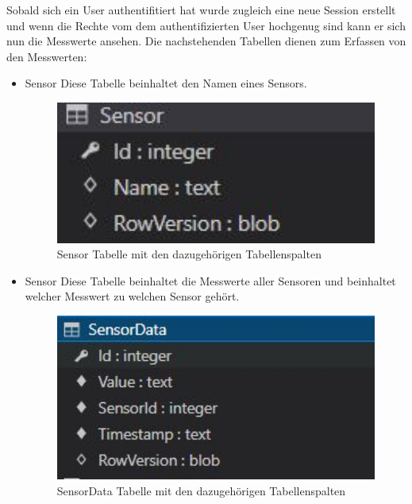 Sobald sich ein User authentifitiert hat wurde zugleich eine neue Session erstellt und wenn die Rechte vom
dem authentifizierten User hochgenug sind kann er sich nun die Messwerte ansehen.
Die nachstehenden Tabellen dienen zum Erfassen von den Messwerten:

\begin{itemize}
    \item Sensor
    Diese Tabelle beinhaltet den Namen eines Sensors.
    \begin{figure}[H]
        \centering
        \includegraphics[width=1\textwidth]{pics/SensorTableStructure.JPG}
        \caption{Sensor Tabelle mit den dazugehörigen Tabellenspalten}
    \end{figure}
\end{itemize}

\begin{itemize}
    \item Sensor
    Diese Tabelle beinhaltet die Messwerte aller Sensoren und beinhaltet welcher Messwert zu welchen Sensor gehört.
    \begin{figure}[H]
        \centering
        \includegraphics[width=1\textwidth]{pics/SensorDataTableStructure.JPG}
        \caption{SensorData Tabelle mit den dazugehörigen Tabellenspalten}
    \end{figure}
\end{itemize}


